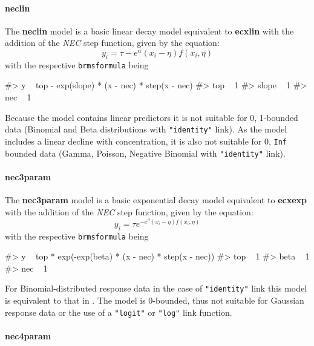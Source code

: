 \hypertarget{neclin}{%
\paragraph{neclin}\label{neclin}}

The \textbf{neclin} model is a basic linear decay model equivalent to
\textbf{ecxlin} with the addition of the \emph{NEC} step function, given
by the equation:
\[y_i = \tau - e^{\alpha} \left(x_i - \eta \right) f(x_i, \eta)\] with
the respective \texttt{brmsformula} being

\begin{Schunk}
\begin{Soutput}
#> y ~ top - exp(slope) * (x - nec) * step(x - nec) 
#> top ~ 1
#> slope ~ 1
#> nec ~ 1
\end{Soutput}
\end{Schunk}

Because the model contains linear predictors it is not suitable for 0,
1-bounded data (Binomial and Beta distributions with \texttt{"identity"}
link). As the model includes a linear decline with concentration, it is
also not suitable for 0, \texttt{Inf} bounded data (Gamma, Poisson,
Negative Binomial with \texttt{"identity"} link).

\hypertarget{nec3param}{%
\paragraph{nec3param}\label{nec3param}}

The \textbf{nec3param} model is a basic exponential decay model
equivalent to \textbf{ecxexp} with the addition of the \emph{NEC} step
function, given by the equation:
\[y_i = \tau e^{-e^{\beta} \left(x_i - \eta \right) f(x_i, \eta)}\] with
the respective \texttt{brmsformula} being

\begin{Schunk}
\begin{Soutput}
#> y ~ top * exp(-exp(beta) * (x - nec) * step(x - nec)) 
#> top ~ 1
#> beta ~ 1
#> nec ~ 1
\end{Soutput}
\end{Schunk}

For Binomial-distributed response data in the case of
\texttt{"identity"} link this model is equivalent to that in
\citet{Fox2010}. The model is 0-bounded, thus not suitable for Gaussian
response data or the use of a \texttt{"logit"} or \texttt{"log"} link
function.

\hypertarget{nec4param}{%
\paragraph{nec4param}\label{nec4param}}


